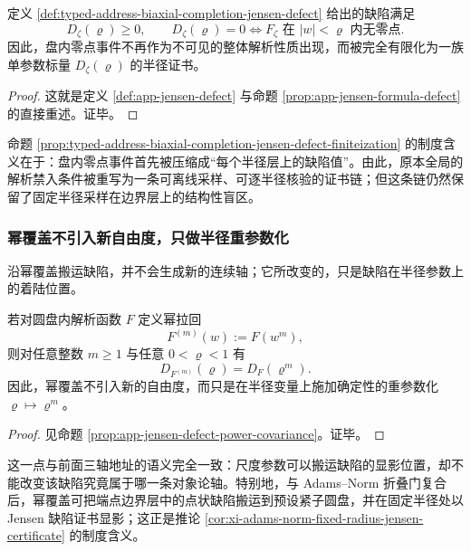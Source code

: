 \begin{proposition}\label{prop:typed-address-biaxial-completion-jensen-defect-finiteization}
定义 \ref{def:typed-address-biaxial-completion-jensen-defect} 给出的缺陷满足
\[
D_{\zeta}(\varrho)\ge 0,
\qquad
D_{\zeta}(\varrho)=0
\iff
F_{\zeta}\text{ 在 }|w|<\varrho\text{ 内无零点}.
\]
因此，盘内零点事件不再作为不可见的整体解析性质出现，而被完全有限化为一族单参数标量 \(D_{\zeta}(\varrho)\) 的半径证书。
\end{proposition}
\begin{proof}
这就是定义 \ref{def:app-jensen-defect} 与命题 \ref{prop:app-jensen-formula-defect} 的直接重述。证毕。
\end{proof}

命题 \ref{prop:typed-address-biaxial-completion-jensen-defect-finiteization} 的制度含义在于：盘内零点事件首先被压缩成“每个半径层上的缺陷值”。由此，原本全局的解析禁入条件被重写为一条可离线采样、可逐半径核验的证书链；但这条链仍然保留了固定半径采样在边界层上的结构性盲区。

\subsubsection{幂覆盖不引入新自由度，只做半径重参数化}\label{subsubsec:typed-address-biaxial-completion-jensen-defect-power-covariance}
沿幂覆盖搬运缺陷，并不会生成新的连续轴；它所改变的，只是缺陷在半径参数上的着陆位置。

\begin{proposition}[缺陷的幂覆盖共变性]\label{prop:typed-address-biaxial-completion-jensen-defect-power-covariance}
若对圆盘内解析函数 \(F\) 定义幂拉回
\[
F^{(m)}(w):=F(w^m),
\]
则对任意整数 \(m\ge 1\) 与任意 \(0<\varrho<1\) 有
\[
D_{F^{(m)}}(\varrho)=D_F(\varrho^m).
\]
因此，幂覆盖不引入新的自由度，而只是在半径变量上施加确定性的重参数化 \(\varrho\mapsto \varrho^m\)。
\end{proposition}
\begin{proof}
见命题 \ref{prop:app-jensen-defect-power-covariance}。证毕。
\end{proof}

这一点与前面三轴地址的语义完全一致：尺度参数可以搬运缺陷的显影位置，却不能改变该缺陷究竟属于哪一条对象论轴。特别地，与 Adams--Norm 折叠门复合后，幂覆盖可把端点边界层中的点状缺陷搬运到预设紧子圆盘，并在固定半径处以 Jensen 缺陷证书显影；这正是推论 \ref{cor:xi-adams-norm-fixed-radius-jensen-certificate} 的制度含义。


